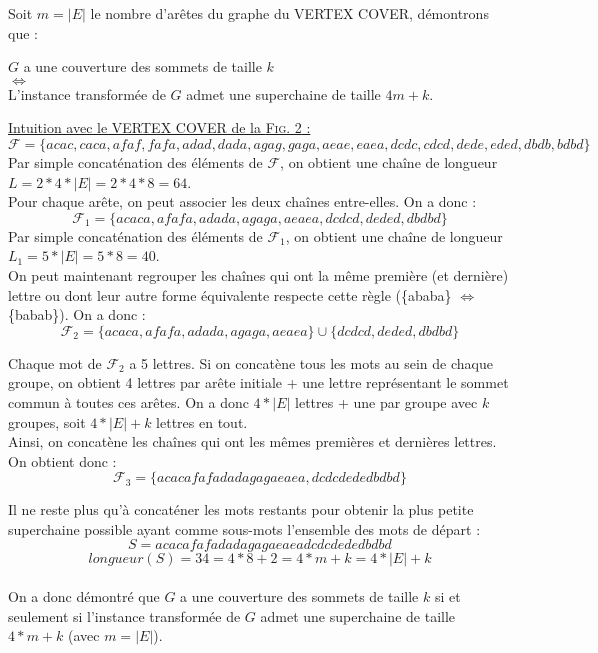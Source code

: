 \documentclass[11pt,letterpaper]{article}
\begin{document}
Soit $m = |E|$ le nombre d'arêtes du graphe du VERTEX COVER, démontrons que :\\
\begin{center}
$G$ a une couverture des sommets de taille $k$\\
$\iff$\\
L'instance transformée de $G$ admet une superchaine de taille $4m + k$.   
\end{center}

\vspace{20px}

\underline{Intuition avec le VERTEX COVER de la \textsc{Fig. 2} :} 
\vspace{-5px}
$$\mathcal{F} = \{acac,caca,afaf,fafa,adad,dada,agag,gaga,aeae,eaea,dcdc,cdcd,dede,eded,dbdb,bdbd\}$$
Par simple concaténation des éléments de $\mathcal{F}$, on obtient une chaîne de longueur $L = 2*4*|E| = 2*4*8 = 64$.\\

\vspace{5px}
Pour chaque arête, on peut associer les deux chaînes entre-elles. On a donc : 
\vspace{-5px}
$$\mathcal{F}_1 = \{acaca,afafa,adada,agaga,aeaea,dcdcd,deded,dbdbd\}$$
Par simple concaténation des éléments de $\mathcal{F}_1$, on obtient une chaîne de longueur $L_1 = 5*|E| = 5*8 = 40$.\\

\vspace{5px}
On peut maintenant regrouper les chaînes qui ont la même première (et dernière) lettre ou dont leur autre forme équivalente respecte cette règle (\{ababa\} $\iff$ \{babab\}). On a donc : 
\vspace{-5px}
$$\mathcal{F}_2 = \{acaca,afafa,adada,agaga,aeaea\} \cup \{dcdcd,deded,dbdbd\}$$

Chaque mot de $\mathcal{F}_2$ a 5 lettres. Si on concatène tous les mots au sein de chaque groupe, on obtient 4 lettres par arête initiale + une lettre représentant le sommet commun à toutes ces arêtes. On a donc $4 * |E|$ lettres + une par groupe avec $k$ groupes, soit $4 * |E| + k$ lettres en tout.\\

Ainsi, on concatène les chaînes qui ont les mêmes premières et dernières lettres. On obtient donc : 
\vspace{-5px}
$$\mathcal{F}_3 = \{acacafafadadagagaeaea,dcdcdededbdbd\}$$

Il ne reste plus qu'à concaténer les mots restants pour obtenir la plus petite superchaine possible ayant comme sous-mots l'ensemble des mots de départ : 
\vspace{-5px}
$$S = acacafafadadagagaeaeadcdcdededbdbd$$
$$longueur(S) = 34 = 4*8+2 = 4*m+k = 4*|E|+k  $$\\

On a donc démontré que $G$ a une couverture des sommets de taille $k$ si et seulement si l'instance transformée de $G$ admet une superchaine de taille $4*m + k$ (avec $m = |E|$). 
\end{document}
